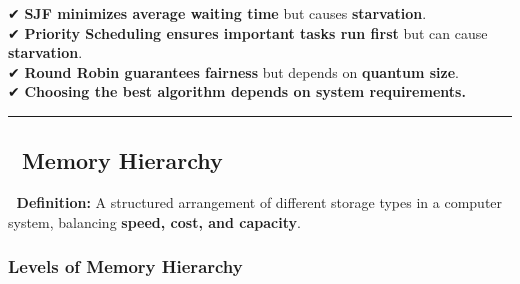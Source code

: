 \documentclass[
]{article}
\begin{document}
✔ \textbf{SJF minimizes average waiting time} but causes
\textbf{starvation}.\\
✔ \textbf{Priority Scheduling ensures important tasks run first} but can
cause \textbf{starvation}.\\
✔ \textbf{Round Robin guarantees fairness} but depends on
\textbf{quantum size}.\\
✔ \textbf{Choosing the best algorithm depends on system requirements.}

\begin{center}\rule{0.5\linewidth}{0.5pt}\end{center}

\subsection{\texorpdfstring{\textbf{📌 Memory
Hierarchy}}{📌 Memory Hierarchy}}\label{memory-hierarchy}

📌 \textbf{Definition:} A structured arrangement of different storage
types in a computer system, balancing \textbf{speed, cost, and
capacity}.

\subsubsection{\texorpdfstring{\textbf{Levels of Memory
Hierarchy}}{Levels of Memory Hierarchy}}\label{levels-of-memory-hierarchy-1}
\end{document}
